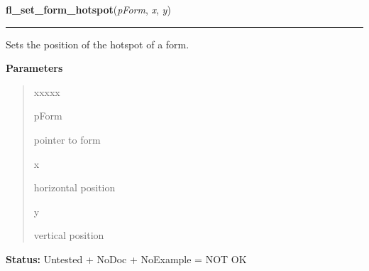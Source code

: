\hspace{.8\funcindent}\begin{boxedminipage}{\funcwidth}

    \raggedright \textbf{fl\_set\_form\_hotspot}(\textit{pForm}, \textit{x}, \textit{y})

    \vspace{-1.5ex}

    \rule{\textwidth}{0.5\fboxrule}
\setlength{\parskip}{2ex}
    Sets the position of the hotspot of a form.

\setlength{\parskip}{1ex}
      \textbf{Parameters}
      \vspace{-1ex}

      \begin{quote}
        \begin{Ventry}{xxxxx}

          \item[pForm]

          pointer to form

          \item[x]

          horizontal position

          \item[y]

          vertical position

        \end{Ventry}

      \end{quote}

\textbf{Status:} Untested + NoDoc + NoExample = NOT OK



    \end{boxedminipage}

    \label{xformslib:library:fl_set_form_hotobject}

    \vspace{0.5ex}

